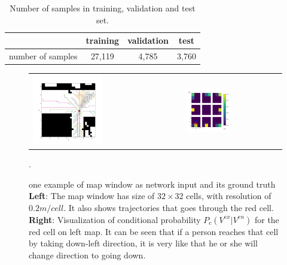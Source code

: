 \begin{table}[t]
\centering
  \begin{tabular}{c|ccc}
    \hline
     & training & validation & test \\ \hline
    number of samples & 27,119 & 4,785 & 3,760\\
    \hline
  \end{tabular}
\caption{Number of samples in training, validation and test set.}
\label{table:nos}
\end{table}

\begin{figure}[H]
\begin{tabular}{ll}
\includegraphics[width=0.48\textwidth]{figures/trajs_through_cell.png}
&
\includegraphics[width=0.48\textwidth]{figures/probs_on_that_cell_2.png}
\end{tabular}
\caption[one example of map window as network input and its ground truth]{one example of map window as network input and its ground truth \textbf{Left}: The map window has size of \( 32 \times 32 \) cells, with resolution of \( 0.2m/cell\). It also shows trajectories that goes through the red cell. \textbf{Right}: Visualization of conditional probability \( P_c(V^{ex} | V^{en}) \) for the red cell on left map. It can be seen that if a person reaches that cell by taking down-left direction, it is very like that he or she will change direction to going down.}. 
\label{fig:trajs}
\end{figure}

